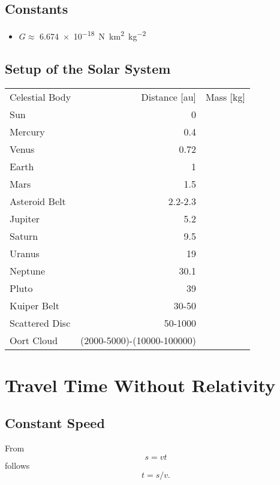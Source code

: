 \documentclass[10pt]{article}
\numberwithin{equation}{section}
\begin{document}
	\subsection{Constants}
	
	\begin{itemize}
		\item $G \approx$ \SI{6.674e-18}{\N\km\squared\per\kg\squared}
	\end{itemize}
	
	\subsection{Setup of the Solar System}
	
	\begin{tabular}{l r r}
		Celestial Body & Distance [\unit{\astronomicalunit}] & Mass [\unit{\kg}]\\
		Sun & 0 & \\
		Mercury & 0.4 & \\
		Venus & 0.72 & \\
		Earth & 1 & \\
		Mars & 1.5 & \\
		Asteroid Belt & 2.2-2.3 & \\
		Jupiter & 5.2 & \\
		Saturn & 9.5 & \\
		Uranus & 19 & \\
		Neptune & 30.1 & \\
		Pluto & 39 & \\
		Kuiper Belt & 30-50 & \\
		Scattered Disc & 50-1000 & \\
		Oort Cloud & (2000-5000)-(\num{10000}-\num{100000}) & \\
	\end{tabular}
	
	\section{Travel Time Without Relativity}\label{TravelTime}
	
	\subsection{Constant Speed}
	
	From	
	\begin{equation}
		s = vt	\end{equation}	
	follows
	\begin{equation}
		t = s/v. \end{equation}
	
\end{document}
